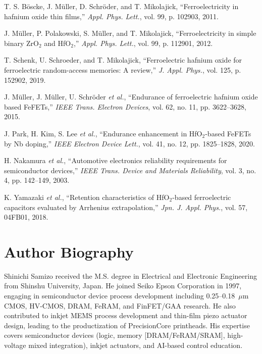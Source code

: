 \documentclass[conference]{IEEEtran}
\begin{document}
\begin{thebibliography}{7}
T. S. B\"oscke, J. M\"uller, D. Schr\"oder, and T. Mikolajick, ``Ferroelectricity in hafnium oxide thin films,'' \emph{Appl. Phys. Lett.}, vol. 99, p. 102903, 2011.

J. M\"uller, P. Polakowski, S. M\"uller, and T. Mikolajick, ``Ferroelectricity in simple binary ZrO$_2$ and HfO$_2$,'' \emph{Appl. Phys. Lett.}, vol. 99, p. 112901, 2012.

T. Schenk, U. Schroeder, and T. Mikolajick, ``Ferroelectric hafnium oxide for ferroelectric random-access memories: A review,'' \emph{J. Appl. Phys.}, vol. 125, p. 152902, 2019.

J. M\"uller, J. M\"uller, U. Schr\"oder \emph{et al.}, ``Endurance of ferroelectric hafnium oxide based FeFETs,'' \emph{IEEE Trans. Electron Devices}, vol. 62, no. 11, pp. 3622--3628, 2015.

J. Park, H. Kim, S. Lee \emph{et al.}, ``Endurance enhancement in HfO$_2$-based FeFETs by Nb doping,'' \emph{IEEE Electron Device Lett.}, vol. 41, no. 12, pp. 1825--1828, 2020.

H. Nakamura \emph{et al.}, ``Automotive electronics reliability requirements for semiconductor devices,'' \emph{IEEE Trans. Device and Materials Reliability}, vol. 3, no. 4, pp. 142--149, 2003.

K. Yamazaki \emph{et al.}, ``Retention characteristics of HfO$_2$-based ferroelectric capacitors evaluated by Arrhenius extrapolation,'' \emph{Jpn. J. Appl. Phys.}, vol. 57, 04FB01, 2018.
\end{thebibliography}

\section*{Author Biography}
Shinichi Samizo received the M.S. degree in Electrical and Electronic Engineering from Shinshu University, Japan. He joined Seiko Epson Corporation in 1997, engaging in semiconductor device process development including 0.25--0.18~$\mu$m CMOS, HV-CMOS, DRAM, FeRAM, and FinFET/GAA research. He also contributed to inkjet MEMS process development and thin-film piezo actuator design, leading to the productization of PrecisionCore printheads. His expertise covers semiconductor devices (logic, memory [DRAM/FeRAM/SRAM], high-voltage mixed integration), inkjet actuators, and AI-based control education.
\end{document}
